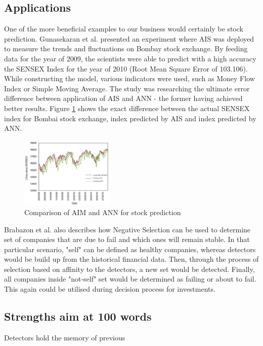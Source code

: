 \documentclass[letterpaper, 10 pt, conference]{ieeeconf}  %
\begin{document}
\subsection{Applications}
One of the more beneficial examples to our business would certainly be stock prediction. Gunasekaran et al. \cite{gunasekaran2011evaluation} presented an experiment where AIS was deployed to measure the trends and fluctuations on Bombay stock exchange. By feeding data for the year of 2009, the scientists were able to predict with a high accuracy the SENSEX Index for the year of 2010 (Root Mean Square Error of 103.106). While constructing the model, various indicators were used, such as Money Flow Index or Simple Moving Average. The study was researching the ultimate error difference between application of AIS and ANN - the former having achieved better results. Figure \ref{fig:stock} shows the exact difference between the actual SENSEX index for Bombai stock exchange, index predicted by AIS and index predicted by ANN. \newline
\begin{figure}[h!]
  \centering
  \includegraphics[width=0.4\textwidth]{graph}
  \caption{Comparison of AIM and ANN for stock prediction \cite{gunasekaran2011evaluation}}
  \label{fig:stock}
\end{figure}
Brabazon et al. \cite{brabazon2006biologically} also describes how Negative Selection can be used to determine set of companies that are due to fail and which ones will remain stable. In that particular scenario, "self" can be defined as healthy companies, whereas detectors would be build up from the historical financial data. Then, through the process of selection based on affinity to the detectors, a new set would be detected. Finally, all companies inside "not-self" set would be determined as failing or about to fail. This again could be utilised during decision process for investments. 


\subsection{Strengths aim at 100 words} 
Detectors hold the memory of previous 
\end{document}
